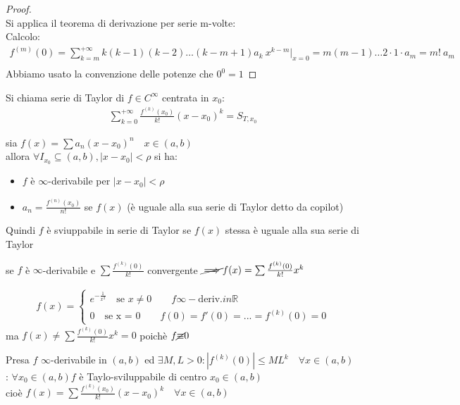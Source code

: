 \documentclass[a4paper, oneside]{article}
\begin{document}
\begin{proof}\hfill\\
  Si applica il teorema di derivazione per serie m-volte:\\
  Calcolo:
  \begin{gather*}
    f^{(m)}(0) = \sum_{k=m}^{+\infty} k(k-1)(k-2) \dots (k - m + 1) a_k \ x^{k-m} \Bigg\rvert_{x=0} = m(m-1) \dots 2 \cdot 1 \cdot a_m = m! \ a_m \\
  \end{gather*}
  Abbiamo usato la convenzione delle potenze che $0^0 = 1$
\end{proof}


\begin{definition}
  Si chiama serie di Taylor di $f \in C^\infty$ centrata in $x_0$:
  \begin{gather*}
    \sum_{k=0}^{+\infty} \frac{f^{(k)}(x_0)}{k!} (x-x_0)^k = S_{T,x_0}
  \end{gather*} 
\end{definition}


\begin{observation}
  sia $f(x) = \sum a_n (x-x_0)^n \quad x \in (a,b)$\\
  allora $\forall I_{x_0} \subseteq (a,b) , |x-x_0| < \rho$ si ha:
  \begin{itemize}
    \item $f$ è $\infty$-derivabile per $|x-x_0| < \rho$
    \item $a_n = \frac{f^{(n)}(x_0)}{n!}$ se $f(x)$ (è uguale alla sua serie di Taylor \tiny detto da copilot\normalsize)
  \end{itemize}
  Quindi $f$ è sviuppabile in serie di Taylor se $f(x)$ stessa è uguale alla sua serie di Taylor
\end{observation}


\begin{observation}
  se $f$ è $\infty$-derivabile e $\sum \frac{f^{(k)}(0)}{k!}$ convergente $\cancel{\implies} f(x) = \sum \frac{f^{(k)}(0)}{k!} x^k$\\
  \begin{example}
    \begin{gather*}
      f(x) = \begin{cases}
        e^{-\frac{1}{x^2}} \quad \text{se } x \neq 0 \qquad f \infty-\text{deriv.} in \mathbb{R} \\
        0 \quad \text{se x = 0} \qquad f(0) = f'(0) = ... = f^{(k)}(0) = 0
      \end{cases}
    \end{gather*}
    ma $f(x) \neq \sum \frac{f^{(k)}(0)}{k!} x^k = 0$ poichè $f \cancel{\equiv} 0$
  \end{example}
\end{observation}


\begin{theorem}
  Presa $f$ $\infty$-derivabile in $(a,b)$ ed $\exists M,L > 0: |f^{(k)}(0)| \leq M L^k \quad \forall x \in (a,b)$\\
  : $\forall x_0 \in (a,b) f$ è Taylo-sviluppabile di centro $x_0 \in (a,b)$\\
  cioè $f(x) = \sum \frac{f^{(k)}(x_0)}{k!} (x-x_0)^k \quad \forall x \in (a,b)$
\end{theorem}
\end{document}
